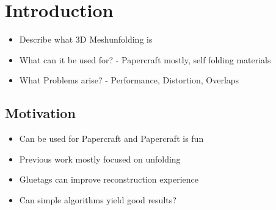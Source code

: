 \documentclass[draft,final]{vutinfth} %
\begin{document}
\frontmatter %

\addstatementpage

\begin{danksagung*}
\end{danksagung*}

\begin{acknowledgements*}
\end{acknowledgements*}

\begin{kurzfassung}
\end{kurzfassung}

\begin{abstract}
\end{abstract}


\tableofcontents %

\mainmatter

\chapter{Introduction}

\begin{itemize}
	\item Describe what 3D Meshunfolding is
	\item What can it be used for? - Papercraft mostly, self folding materials
	\item What Problems arise? - Performance, Distortion, Overlaps
\end{itemize}

\section{Motivation}

\begin{itemize}
	\item Can be used for Papercraft and Papercraft is fun
	\item Previous work mostly focused on unfolding
	\item Gluetags can improve reconstruction experience
	\item Can simple algorithms yield good results?
\end{itemize}
\end{document}
